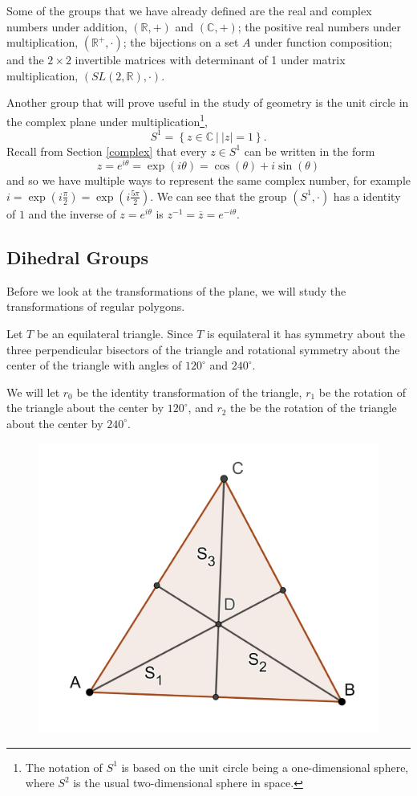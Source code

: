 \documentclass[
]{book}
\theoremstyle{definition}
\theoremstyle{definition}
\theoremstyle{definition}
\theoremstyle{definition}
\theoremstyle{remark}
\begin{document}
Some of the groups that we have already defined are the real and complex numbers under addition, \((\mathbb{R},+)\) and \((\mathbb{C},+)\); the positive real numbers under multiplication, \((\mathbb{R}^+, \cdot)\); the bijections on a set \(A\) under function composition; and the \(2\times 2\) invertible matrices with determinant of 1 under matrix multiplication, \((SL(2,\mathbb{R}),\cdot)\).

Another group that will prove useful in the study of geometry is the unit circle in the complex plane under multiplication\footnote{The notation of $S^1$ is based on the unit circle being a one-dimensional sphere, where $S^2$ is the usual two-dimensional sphere in space.}, \[S^1 = \left\{ z\in \mathbb{C}\: \vert \: |z|=1\right\}.\] Recall from Section \ref{complex} that every \(z\in S^1\) can be written in the form \[z= e^{i\theta} = \exp(i\theta)= \cos (\theta) + i \sin(\theta)\] and so we have multiple ways to represent the same complex number, for example \(i=\exp\left(i\frac{\pi}{2}\right)= \exp \left( i \frac{5\pi}{2}\right)\). We can see that the group \((S^1,\cdot)\) has a identity of \(1\) and the inverse of \(z=e^{i\theta}\) is \(z^{-1}=\overline{z} = e^{-i\theta}\).

\hypertarget{dihedral-groups}{%
\subsection{Dihedral Groups}\label{dihedral-groups}}

Before we look at the transformations of the plane, we will study the transformations of regular polygons.

Let \(T\) be an equilateral triangle. Since \(T\) is equilateral it has symmetry about the three perpendicular bisectors of the triangle and rotational symmetry about the center of the triangle with angles of \(120^\circ\) and \(240^\circ\).

We will let \(r_0\) be the identity transformation of the triangle, \(r_1\) be the rotation of the triangle about the center by \(120^\circ\), and \(r_2\) the be the rotation of the triangle about the center by \(240^\circ\).

\begin{figure}

{\centering \includegraphics[width=0.4\linewidth]{images/D3Group} 

}

\end{figure}
\end{document}
